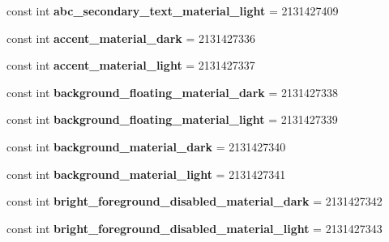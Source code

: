 \begin{DoxyCompactItemize}
const int {\bfseries abc\+\_\+secondary\+\_\+text\+\_\+material\+\_\+light} = 2131427409
\item 
\mbox{\label{class_sample_app_1_1_droid_1_1_resource_1_1_color_ab7641812e241e14e06fc912b6b140d37}} 
const int {\bfseries accent\+\_\+material\+\_\+dark} = 2131427336
\item 
\mbox{\label{class_sample_app_1_1_droid_1_1_resource_1_1_color_afda558137f5846d109b05f16386f7599}} 
const int {\bfseries accent\+\_\+material\+\_\+light} = 2131427337
\item 
\mbox{\label{class_sample_app_1_1_droid_1_1_resource_1_1_color_acece552de8c386eef60d61fab32f5bb7}} 
const int {\bfseries background\+\_\+floating\+\_\+material\+\_\+dark} = 2131427338
\item 
\mbox{\label{class_sample_app_1_1_droid_1_1_resource_1_1_color_aaec38c86e9a7ad84e00deb747a0b584c}} 
const int {\bfseries background\+\_\+floating\+\_\+material\+\_\+light} = 2131427339
\item 
\mbox{\label{class_sample_app_1_1_droid_1_1_resource_1_1_color_a0b3f3be286939d1eb704634c821cb100}} 
const int {\bfseries background\+\_\+material\+\_\+dark} = 2131427340
\item 
\mbox{\label{class_sample_app_1_1_droid_1_1_resource_1_1_color_a66635d444c7686439c6dda090d2e7d3e}} 
const int {\bfseries background\+\_\+material\+\_\+light} = 2131427341
\item 
\mbox{\label{class_sample_app_1_1_droid_1_1_resource_1_1_color_a407cb34a2a898ff682cbc6dd2e784256}} 
const int {\bfseries bright\+\_\+foreground\+\_\+disabled\+\_\+material\+\_\+dark} = 2131427342
\item 
\mbox{\label{class_sample_app_1_1_droid_1_1_resource_1_1_color_a786fa337d2bbc80cba5fc6eb351a7a76}} 
const int {\bfseries bright\+\_\+foreground\+\_\+disabled\+\_\+material\+\_\+light} = 2131427343

\end{DoxyCompactItemize}
